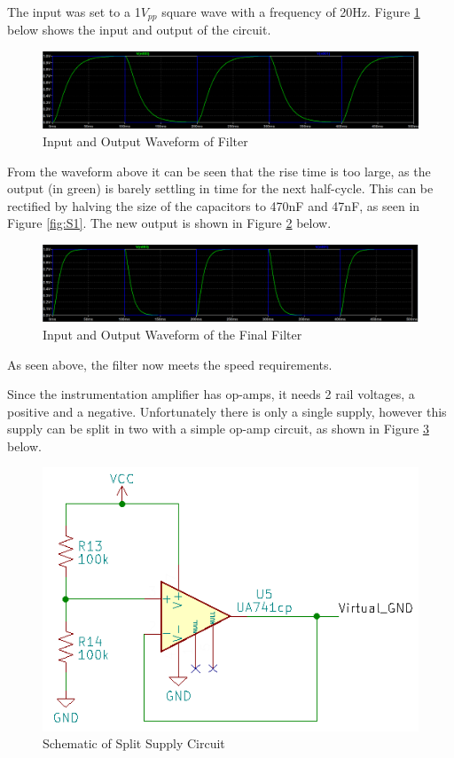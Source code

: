 \documentclass[class=report,11pt,crop=false]{standalone}
\begin{document}
	The input was set to a 1$V_{pp}$ square wave with a frequency of 20Hz. Figure \ref{fig:S3} below shows the input and output of the circuit.
	
	\begin{figure}[h!]
		\centering
		\includegraphics[width=0.9\linewidth]{Figures/Filter Waveform.png}
		\caption{Input and Output Waveform of Filter}
		\label{fig:S3}
	\end{figure}
	
	From the waveform above it can be seen that the rise time is too large, as the output (in green) is barely settling in time for the next half-cycle. This can be rectified by halving the size of the capacitors to 470nF and 47nF, as seen in Figure \ref{fig:S1}. The new output is shown in Figure \ref{fig:S4} below.
	
	\begin{figure}[h!]
		\centering
		\includegraphics[width=0.9\linewidth]{Figures/Filter Waveform2.png}
		\caption{Input and Output Waveform of the Final Filter}
		\label{fig:S4}
	\end{figure}
	As seen above, the filter now meets the speed requirements.
	
	Since the instrumentation amplifier has op-amps, it needs 2 rail voltages, a positive and a negative. Unfortunately there is only a single supply, however this supply can be split in two with a simple op-amp circuit, as shown in Figure \ref{fig:S5} below.
	\begin{figure}[h!]
		\centering
		\includegraphics[width=0.6\linewidth]{Figures/Split Supply.png}
		\caption{Schematic of Split Supply Circuit}
		\label{fig:S5}
	\end{figure}
	
\end{document}
